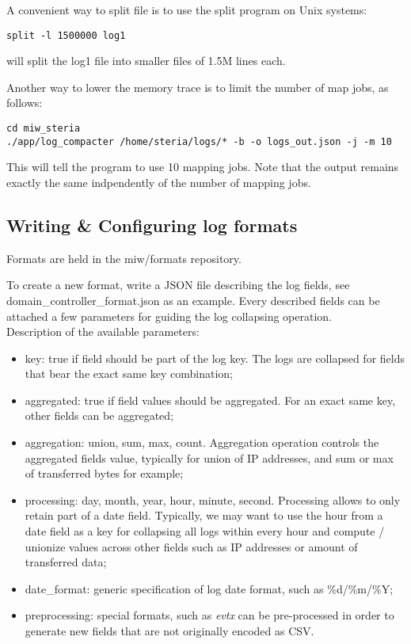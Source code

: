 \documentclass[twoside,11pt]{article}
\begin{document}
A convenient way to split file is to use the split program on Unix systems:
\begin{verbatim}
split -l 1500000 log1
\end{verbatim}
will split the log1 file into smaller files of 1.5M lines each.

Another way to lower the memory trace is to limit the number of map jobs, as follows:
\begin{verbatim}
cd miw_steria
./app/log_compacter /home/steria/logs/* -b -o logs_out.json -j -m 10
\end{verbatim}
This will tell the program to use 10 mapping jobs. Note that the output remains exactly the same indpendently of the number of mapping jobs.

\subsection{Writing \& Configuring log formats}
Formats are held in the miw\//formats repository.

To create a new format, write a JSON file describing the log fields, see domain\_controller\_format.json as an example.
Every described fields can be attached a few parameters for guiding the log collapsing operation.\\

Description of the available parameters:
\begin{itemize}
\item key: true if field should be part of the log key. The logs are collapsed for fields that bear the exact same key combination;
\item aggregated: true if field values should be aggregated. For an exact same key, other fields can be aggregated;
\item aggregation: union, sum, max, count. Aggregation operation controls the aggregated fields value, typically for union of IP addresses, and sum or max of transferred bytes for example;
\item processing: day, month, year, hour, minute, second. Processing allows to only retain part of a date field. Typically, we may want to use the hour from a date field as a key for collapsing all logs within every hour and compute / unionize values across other fields such as IP addresses or amount of transferred data;
\item date\_format: generic specification of log date format, such as \%d/\%m/\%Y;
\item preprocessing: special formats, such as \emph{evtx} can be pre-processed in order to generate new fields that are not originally encoded as CSV.
\end{itemize}
\end{document}

